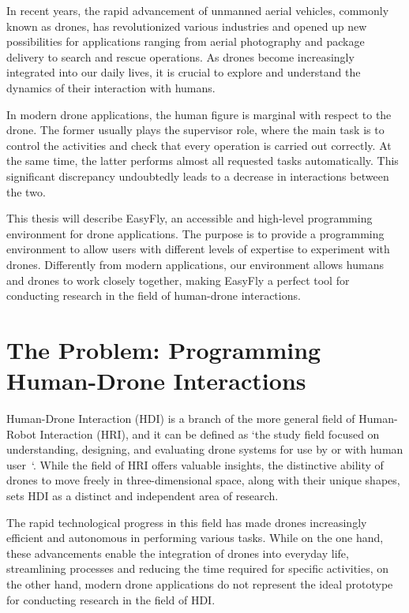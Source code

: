 In recent years, the rapid advancement of unmanned aerial vehicles, commonly known as drones,
has revolutionized various industries and opened up new possibilities for applications ranging
from aerial photography and package delivery to search and rescue operations. As drones become
increasingly integrated into our daily lives, it is crucial to explore and understand the dynamics
of their interaction with humans.

In modern drone applications, the human figure is marginal with respect to the drone.
The former usually plays the supervisor role, where the main task is to control the activities and check that every operation is carried out correctly. 
At the same time, the latter performs almost all requested tasks automatically.
This significant discrepancy undoubtedly leads to a decrease in interactions between the two.

This thesis will describe EasyFly, an accessible and high-level programming environment for drone applications.
The purpose is to provide a programming environment to allow users with different levels of expertise to experiment with drones. 
Differently from modern applications, our environment allows humans and drones to work closely together,
making EasyFly a perfect tool for conducting research in the field of human-drone interactions.


\section{The Problem: Programming Human-Drone Interactions}\label{sec:the_problem}
Human-Drone Interaction (HDI) is a branch of the more general field of Human-Robot Interaction (HRI), and it can be defined as 
`the study field focused on understanding, designing, and evaluating drone systems for use by or with human user~\cite{tezza2019hdi}`.
While the field of HRI offers valuable insights, the distinctive ability of drones to move freely in three-dimensional
space, along with their unique shapes, sets HDI as a distinct and independent area of research.

The rapid technological progress in this field has made drones increasingly efficient and autonomous in performing various
tasks. While on the one hand, these advancements enable the integration of drones into everyday life, streamlining processes
and reducing the time required for specific activities, on the other hand, modern drone applications do not represent the
ideal prototype for conducting research in the field of HDI.

